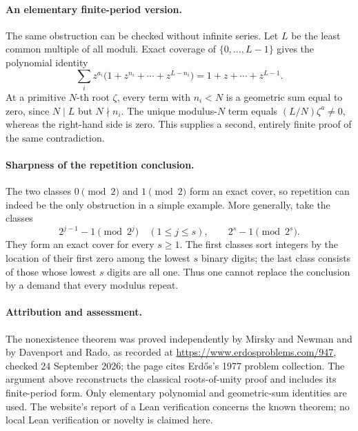 \paragraph{An elementary finite-period version.}
The same obstruction can be checked without infinite series. Let \(L\) be the least common multiple of all moduli. Exact coverage of \(\{0,\ldots,L-1\}\) gives the polynomial identity
\[
 \sum_i z^{a_i}\bigl(1+z^{n_i}+\cdots+z^{L-n_i}\bigr)
 =1+z+\cdots+z^{L-1}.
\]
At a primitive \(N\)-th root \(\zeta\), every term with \(n_i<N\) is a geometric sum equal to zero, since \(N\mid L\) but \(N\nmid n_i\). The unique modulus-\(N\) term equals \((L/N)\zeta^a\ne0\), whereas the right-hand side is zero. This supplies a second, entirely finite proof of the same contradiction.

\paragraph{Sharpness of the repetition conclusion.}
The two classes \(0\pmod2\) and \(1\pmod2\) form an exact cover, so repetition can indeed be the only obstruction in a simple example. More generally, take the classes
\[
 2^{j-1}-1\pmod{2^j}\quad(1\leq j\leq s),
 \qquad 2^s-1\pmod{2^s}.
\]
They form an exact cover for every \(s\geq1\). The first classes sort integers by the location of their first zero among the lowest \(s\) binary digits; the last class consists of those whose lowest \(s\) digits are all one. Thus one cannot replace the conclusion by a demand that every modulus repeat.

\paragraph{Attribution and assessment.}
The nonexistence theorem was proved independently by Mirsky and Newman and by Davenport and Rado, as recorded at \url{https://www.erdosproblems.com/947}, checked 24 September 2026; the page cites Erd\H{o}s's 1977 problem collection. The argument above reconstructs the classical roots-of-unity proof and includes its finite-period form. Only elementary polynomial and geometric-sum identities are used. The website's report of a Lean verification concerns the known theorem; no local Lean verification or novelty is claimed here.
